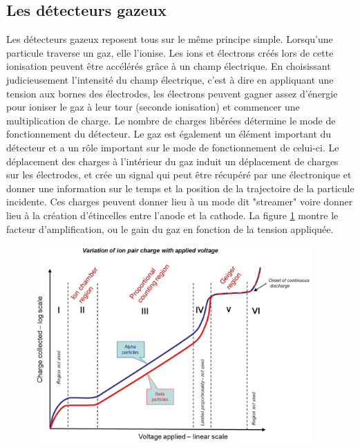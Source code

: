 \subsection{Les détecteurs gazeux}
Les détecteurs gazeux reposent tous sur le même principe simple. Lorsqu'une particule traverse un gaz, elle l'ionise. Les ions et électrons créés lors de cette ionisation peuvent être accélérés grâce à un champ électrique. En choisissant judicieusement l'intensité du champ électrique, c'est à dire en appliquant une tension aux bornes des électrodes, les électrons peuvent gagner assez d'énergie pour ioniser le gaz à leur tour (seconde ionisation) et commencer une multiplication de charge. Le nombre de charges libérées détermine le mode de fonctionnement du détecteur. Le gaz est également un élément important du détecteur et a un rôle important sur le mode de fonctionnement de celui-ci. Le déplacement des charges à l'intérieur du gaz induit un déplacement de charges sur les électrodes, et crée un signal qui peut être récupéré par une électronique et donner une information sur le temps et la position de la trajectoire de la particule incidente. Ces charges peuvent donner lieu à un mode dit "streamer" voire donner lieu à la création d'étincelles entre l'anode et la cathode. La figure \ref{mult} montre le facteur d'amplification, ou le gain du gaz en fonction de la tension appliquée. 

\begin{figure}[ht!]
	\centering
	\includegraphics[width=0.95\textwidth]{RPC/gasgain.png}
	\label{mult}
\end{figure}

